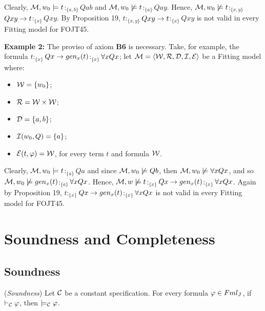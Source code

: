 \qquad Clearly, $\mathcal{M},w_0 \models t$$:_{\{a,b\}}$$Qab$ and $\mathcal{M},w_0 \not\models t$$:_{\{a\}}$$Qay$. Hence, $\mathcal{M},w_0 \not\models t$$:_{\{x,y\}}$$Qxy \rightarrow t$$:_{\{x\}}$$Qxy$. By Proposition 19, $t$$:_{\{x,y\}}$$Qxy \rightarrow t$$:_{\{x\}}$$Qxy$ is not valid in every Fitting model for FOJT45.


\qquad \textbf{Example 2:} The proviso of axiom \textbf{B6} is necessary. Take, for example, the formula $t$$:_{\{x\}}$$Qx \rightarrow gen_{x}(t)$$:_{\{x\}}$$\forall x Qx$; let $\mathcal{M} =\langle\mathcal{W},\mathcal{R},\mathcal{D},\mathcal{I},\mathcal{E} \rangle$ be a Fitting model where:
\begin{itemize}
	\item $\mathcal{W} = \{w_0\}$;
	\item $\mathcal{R} = \mathcal{W} \times \mathcal{W}$;
	\item $\mathcal{D} = \{a,b\}$;
	\item $\mathcal{I}(w_{0},Q) =  \{a\}$;
	\item $\mathcal{E}(t,\varphi) = \mathcal{W}$, for every term $t$ and formula $\mathcal{W}$.
\end{itemize}


\qquad Clearly, $\mathcal{M},w_0 \models t$$:_{\{a\}}$$Qa$ and since $\mathcal{M},w_0 \not\models Qb$, then $\mathcal{M},w_0 \not\models \forall x Qx$, and so $\mathcal{M},w_0 \not\models gen_{x}(t)$$:_{\{a\}}$$\forall x Qx$. Hence, $\mathcal{M},w \not\models t$$:_{\{x\}}$$Qx \rightarrow gen_{x}(t)$$:_{\{x\}}$$\forall x Qx$. Again by Proposition 19, $t$$:_{\{x\}}$$Qx \rightarrow gen_{x}(t)$$:_{\{x\}}$$\forall x Qx$ is not valid in every Fitting model for FOJT45.

\section{Soundness and Completeness}

\subsection{Soundness}

\begin{teor}
	(\textit{Soundness}) Let $\mathcal{C}$ be a constant specification. For every formula $\varphi \in Fml_{J}$, if $\vdash_{\mathcal{C}} \varphi$, then $\models_{\mathcal{C}}\varphi$.
\end{teor}    

